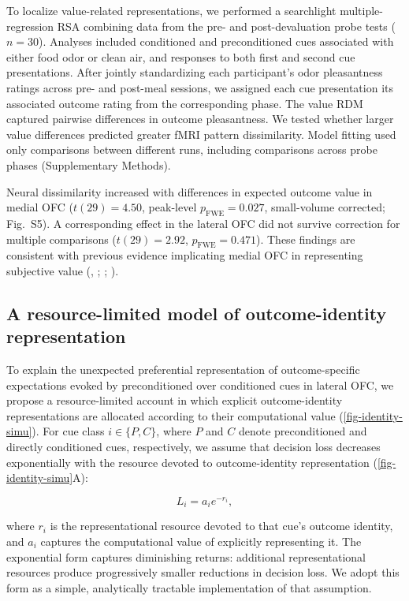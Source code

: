 \documentclass[12pt,letterpaper]{article}
\DeclareRobustCommand{\hl}{\textcolor{reviewtext}}
\begin{document}
To localize value-related representations, we performed a searchlight multiple-regression RSA combining data from the pre- and post-devaluation probe tests ($n = 30$). Analyses included conditioned and preconditioned cues associated with either food odor or clean air, and responses to both first and second cue presentations. After jointly standardizing each participant's odor pleasantness ratings across pre- and post-meal sessions, we assigned each cue presentation its associated outcome rating from the corresponding phase. The value RDM captured pairwise differences in outcome pleasantness. We tested whether larger value differences predicted greater fMRI pattern dissimilarity. Model fitting used only comparisons between different runs, including comparisons across probe phases (Supplementary Methods).

Neural dissimilarity increased with differences in expected outcome value in medial OFC ($t(29) = 4.50$, peak-level $p_{\mathrm{FWE}} = 0.027$, small-volume corrected; Fig.~S5). A corresponding effect in the lateral OFC did not survive correction for multiple comparisons ($t(29) = 2.92$, $p_{\mathrm{FWE}} = 0.471$). These findings are consistent with previous evidence implicating medial OFC in representing subjective value (\citealp{levy2012root,mcnamee13,howard2015identity}, \hl{\mbox{\citealp{plassmann2007orbitofrontal}}; \mbox{\citealp{fitzgerald2009role}}; \mbox{\citealp{lebreton2009automatic}}}).

\subsection*{A resource-limited model of outcome-identity representation}

To explain the unexpected preferential representation of outcome-specific expectations evoked by preconditioned over conditioned cues in lateral OFC, we propose a resource-limited account in which explicit outcome-identity representations are allocated according to their computational value (\autoref{fig-identity-simu}). For cue class $i \in \{P,C\}$, where $P$ and $C$ denote preconditioned and directly conditioned cues, respectively, we assume that decision loss decreases exponentially with the resource devoted to outcome-identity representation (\autoref{fig-identity-simu}A):


\begin{equation}
L_i = a_i e^{-r_i},
\end{equation}

where $r_i$ is the representational resource devoted to that cue's outcome identity, and $a_i$ captures the computational value of explicitly representing it. The exponential form captures diminishing returns: additional representational resources produce progressively smaller reductions in decision loss. We adopt this form as a simple, analytically tractable implementation of that assumption.
\end{document}
